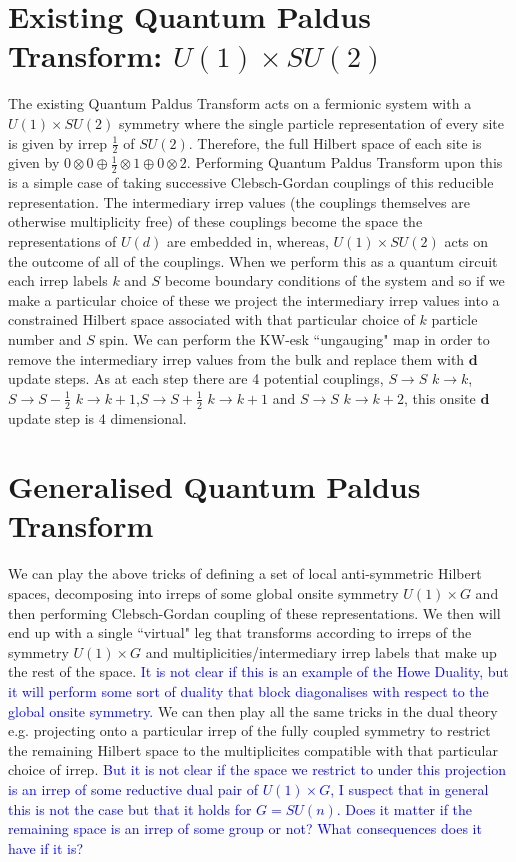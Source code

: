 \documentclass[aps,prx,twocolumn,floatfix,10pt,amssymb,amsfont,amsmath,superscriptaddress,float,nofootinbib,longbibliography,nobalancelastpage]{revtex4-2}
\begin{document}
\section{Existing Quantum Paldus Transform: $U(1) \times SU(2)$}
The existing Quantum Paldus Transform acts on a fermionic system with a $U(1) \times SU(2)$ symmetry where the single particle representation of every site is given by irrep $\frac{1}{2}$ of $SU(2)$. Therefore, the full Hilbert space of each site is given by $0 \otimes 0 \oplus \frac{1}{2} \otimes 1 \oplus 0\otimes2$. Performing Quantum Paldus Transform upon this is a simple case of taking successive Clebsch-Gordan couplings of this reducible representation. The intermediary irrep values (the couplings themselves are otherwise multiplicity free) of these couplings become the space the representations of $U(d)$ are embedded in, whereas, $U(1) \times SU(2)$ acts on the outcome of all of the couplings. When we perform this as a quantum circuit each irrep labels $k$ and $S$ become boundary conditions of the system and so if we make a particular choice of these we project the intermediary irrep values into a constrained Hilbert space associated with that particular choice of $k$ particle number and $S$ spin. We can perform the KW-esk ``ungauging" map in order to remove the intermediary irrep values from the bulk and replace them with $\bm d$ update steps. As at each step there are 4 potential couplings, $S \rightarrow S$ $k \rightarrow k$, $S \rightarrow S-\frac{1}{2}$ $k \rightarrow k+1$,$S \rightarrow S+\frac{1}{2}$ $k \rightarrow k+1$ and $S \rightarrow S$ $k \rightarrow k+2$, this onsite $\bm d$ update step is $4$ dimensional. 


\section{Generalised Quantum Paldus Transform}
We can play the above tricks of defining a set of local anti-symmetric Hilbert spaces, decomposing into irreps of some global onsite symmetry $U(1) \times G$ and then performing Clebsch-Gordan coupling of these representations. We then will end up with a single ``virtual" leg that transforms according to irreps of the symmetry $U(1) \times G$ and multiplicities/intermediary irrep labels that make up the rest of the space. \textcolor{blue}{It is not clear if this is an example of the Howe Duality, but it will perform some sort of duality that block diagonalises with respect to the global onsite symmetry.} We can then play all the same tricks in the dual theory e.g. projecting onto a particular irrep of the fully coupled symmetry to restrict the remaining Hilbert space to the multiplicites compatible with that particular choice of irrep. \textcolor{blue}{But it is not clear if the space we restrict to under this projection is an irrep of some reductive dual pair of $U(1) \times G$, I suspect that in general this is not the case but that it holds for $G= SU(n)$. Does it matter if the remaining space is an irrep of some group or not? What consequences does it have if it is?}
\end{document}
